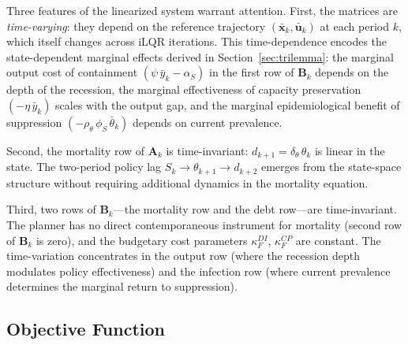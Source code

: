 \documentclass[12pt, a4paper]{article}
\begin{document}
Three features of the linearized system warrant attention. First, the matrices are
\textit{time-varying}: they depend on the reference trajectory
$(\bar{\bm{x}}_k, \bar{\bm{u}}_k)$ at each period $k$, which itself changes across
iLQR iterations. This time-dependence encodes the state-dependent marginal effects
derived in Section~\ref{sec:trilemma}: the marginal output cost of containment
$(\psi\,\bar{y}_k - \alpha_S)$ in the first row of $\bm{B}_k$ depends on the depth of
the recession, the marginal effectiveness of capacity preservation $(-\eta\,\bar{y}_k)$
scales with the output gap, and the marginal epidemiological benefit of suppression
$(-\rho_\theta\,\phi_S\,\bar{\theta}_k)$ depends on current prevalence.

Second, the mortality row of $\bm{A}_k$ is time-invariant: $d_{k+1} = \delta_\theta\,
\theta_k$ is linear in the state. The two-period policy lag
$S_k \to \theta_{k+1} \to d_{k+2}$ emerges from the state-space structure without
requiring additional dynamics in the mortality equation.

Third, two rows of $\bm{B}_k$---the mortality row and the debt row---are
time-invariant. The planner has no direct contemporaneous instrument for mortality
(second row of $\bm{B}_k$ is zero), and the budgetary cost parameters
$\kappa_F^{DI}$, $\kappa_F^{CP}$ are constant. The time-variation concentrates in the
output row (where the recession depth modulates policy effectiveness) and the infection
row (where current prevalence determines the marginal return to suppression).


\subsection{Objective Function}
\label{sec:objective}
\end{document}

